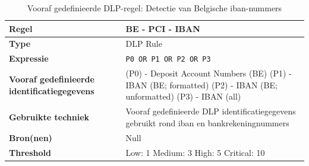 

\begin{table}[H]
    \centering
    \small
    \scriptsize
    \begin{tabular}{p{4cm} p{10cm}}
        \toprule
        \textbf{Regel} & BE \-- PCI \-- IBAN \\
        \midrule
        \textbf{Type} & DLP Rule \\
        \textbf{Expressie} & \texttt{P0 OR P1 OR P2 OR P3 } \\
        \textbf{Vooraf gedefinieerde identificatiegegevens} & 
        (P0) \-- Deposit Account Numbers (BE)
        (P1) \-- IBAN (BE; formatted)
        (P2) \-- IBAN (BE; unformatted)
        (P3) \-- IBAN (all) \\
        \textbf{Gebruikte techniek} & Vooraf gedefinieerde DLP identificatiegegevens gebruikt rond \gls{iban} en bankrekeningnummers \\
        \textbf{Bron(nen)} & Null \\
        \textbf{Threshold} & Low: 1 \quad Medium: 3 \quad High: 5 \quad Critical: 10 \\
        \bottomrule
    \end{tabular}
    \caption{Vooraf gedefinieerde DLP-regel: Detectie van Belgische \gls{iban}-nummers}
    \label{tab:custom-be-iban}
\end{table}

